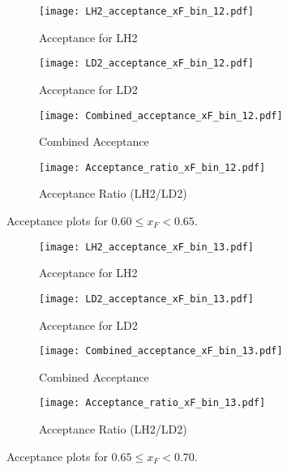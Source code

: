 \documentclass{article}
\begin{document}
\begin{figure}[H]
    \centering
    \begin{subfigure}[b]{0.48\textwidth}
       \texttt{[image: LH2\_acceptance\_xF\_bin\_12.pdf]}
       \caption{Acceptance for LH2}
    \end{subfigure}
    \hfill
    \begin{subfigure}[b]{0.48\textwidth}
       \texttt{[image: LD2\_acceptance\_xF\_bin\_12.pdf]}
       \caption{Acceptance for LD2}
    \end{subfigure}

    \begin{subfigure}[b]{0.48\textwidth}
       \texttt{[image: Combined\_acceptance\_xF\_bin\_12.pdf]}
       \caption{Combined Acceptance}
    \end{subfigure}
    \hfill
    \begin{subfigure}[b]{0.48\textwidth}
       \texttt{[image: Acceptance\_ratio\_xF\_bin\_12.pdf]}
       \caption{Acceptance Ratio (LH2/LD2)}
    \end{subfigure}
    \caption{Acceptance plots for $0.60 \le x_F < 0.65$.}
\end{figure}

\begin{figure}[H]
    \centering
    \begin{subfigure}[b]{0.48\textwidth}
       \texttt{[image: LH2\_acceptance\_xF\_bin\_13.pdf]}
       \caption{Acceptance for LH2}
    \end{subfigure}
    \hfill
    \begin{subfigure}[b]{0.48\textwidth}
       \texttt{[image: LD2\_acceptance\_xF\_bin\_13.pdf]}
       \caption{Acceptance for LD2}
    \end{subfigure}

    \begin{subfigure}[b]{0.48\textwidth}
       \texttt{[image: Combined\_acceptance\_xF\_bin\_13.pdf]}
       \caption{Combined Acceptance}
    \end{subfigure}
    \hfill
    \begin{subfigure}[b]{0.48\textwidth}
       \texttt{[image: Acceptance\_ratio\_xF\_bin\_13.pdf]}
       \caption{Acceptance Ratio (LH2/LD2)}
    \end{subfigure}
    \caption{Acceptance plots for $0.65 \le x_F < 0.70$.}
\end{figure}
\end{document}
